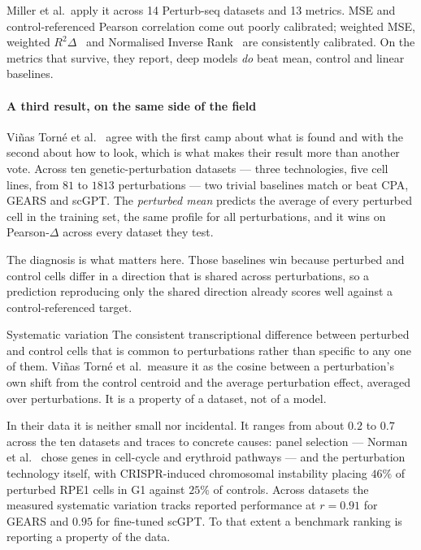 Miller et al.\ apply it across 14 Perturb-seq datasets and 13 metrics. MSE and
control-referenced Pearson correlation come out poorly calibrated; weighted MSE,
weighted $R^2\Delta$~\cite{mejia} and Normalised Inverse
Rank~\cite{perturbench} are consistently calibrated. On the metrics that survive,
they report, deep models \emph{do} beat mean, control and linear baselines.

\paragraph{A third result, on the same side of the field}
Vi\~nas Torn\'e et al.~\cite{systema} agree with the first camp about what is
found and with the second about how to look, which is what makes their result
more than another vote. Across ten genetic-perturbation datasets --- three
technologies, five cell lines, from $81$ to $\num{1813}$ perturbations --- two
trivial baselines match or beat CPA, GEARS and scGPT. The \emph{perturbed mean}
predicts the average of every perturbed cell in the training set, the same
profile for all perturbations, and it wins on Pearson-$\Delta$ across every
dataset they test.

The diagnosis is what matters here. Those baselines win because perturbed and
control cells differ in a direction that is shared across perturbations, so a
prediction reproducing only the shared direction already scores well against a
control-referenced target.

\begin{defn}{Systematic variation}
The consistent transcriptional difference between perturbed and control cells
that is common to perturbations rather than specific to any one of them. Vi\~nas
Torn\'e et al.\ measure it as the cosine between a perturbation's own shift from
the control centroid and the average perturbation effect, averaged over
perturbations. It is a property of a dataset, not of a model.
\end{defn}

In their data it is neither small nor incidental. It ranges from about $0.2$ to
$0.7$ across the ten datasets and traces to concrete causes: panel selection ---
Norman et al.~\cite{norman} chose genes in cell-cycle and erythroid pathways ---
and the perturbation technology itself, with CRISPR-induced chromosomal
instability placing $46\%$ of perturbed RPE1 cells in G1 against $25\%$ of
controls. Across datasets the measured systematic variation tracks reported
performance at $r = 0.91$ for GEARS and $0.95$ for fine-tuned scGPT. To that
extent a benchmark ranking is reporting a property of the data.

